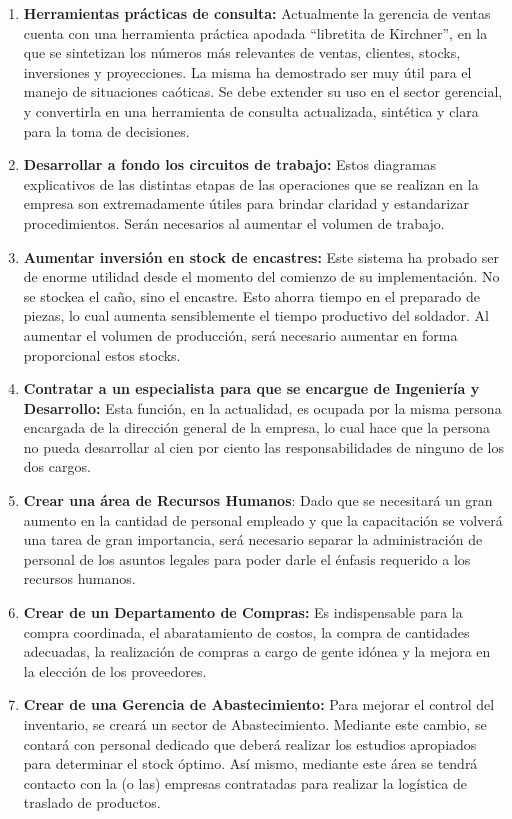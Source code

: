 \documentclass[a4paper,10pt,titlepage]{article}
\begin{document}
\begin{enumerate}
\item \textbf{Herramientas pr\'acticas de consulta:} Actualmente la gerencia de ventas cuenta con una herramienta pr\'actica apodada ``libretita de Kirchner'', en la que se sintetizan los n\'umeros m\'as relevantes de ventas, clientes, stocks, inversiones y proyecciones. La misma ha demostrado ser muy \'util para el manejo de situaciones ca\'oticas. Se debe extender su uso en el sector gerencial, y convertirla en una herramienta de consulta actualizada, sint\'etica y clara para la toma de decisiones.

\item \textbf{Desarrollar a fondo los circuitos de trabajo:} Estos diagramas explicativos de las distintas etapas de las operaciones que se realizan en la empresa son extremadamente \'utiles para brindar claridad y estandarizar procedimientos. Ser\'an necesarios al aumentar el volumen de trabajo.

\item \textbf{Aumentar inversi\'on en stock de encastres:} Este sistema ha probado ser de enorme utilidad desde el momento del comienzo de su implementaci\'on. No se stockea el ca\~no, sino el encastre. Esto ahorra tiempo en el preparado de piezas, lo cual aumenta sensiblemente el tiempo productivo del soldador. Al aumentar el volumen de producci\'on, ser\'a necesario aumentar en forma proporcional estos stocks.

\item \textbf{Contratar a un especialista para que se encargue de Ingenier\'ia y Desarrollo:} Esta funci\'on, en la actualidad, es ocupada por la misma persona encargada de la direcci\'on general de la empresa, lo cual hace que la persona no pueda desarrollar al cien por ciento las responsabilidades de ninguno de los dos cargos.

\item \textbf{Crear una \'area de Recursos Humanos}: Dado que se necesitar\'a un gran aumento en la cantidad de personal empleado y que la capacitaci\'on se volver\'a una tarea de gran importancia, ser\'a necesario separar la administraci\'on de personal de los asuntos legales para poder darle el \'enfasis requerido a los recursos humanos.

\item \textbf{Crear de un Departamento de Compras:} Es indispensable para la compra coordinada, el abaratamiento de costos, la compra de cantidades adecuadas, la realizaci\'on de compras a cargo de gente id\'onea y la mejora en la elecci\'on de los proveedores.

\item \textbf{Crear de una Gerencia de Abastecimiento:} Para mejorar el control del inventario, se crear\'a un sector de Abastecimiento. Mediante este cambio, se contar\'a con personal dedicado que deber\'a realizar los estudios apropiados para determinar el stock \'optimo. As\'i mismo, mediante este \'area se tendr\'a contacto con la (o las) empresas contratadas para realizar la log\'istica de traslado de productos.

\end{enumerate}
\end{document}
